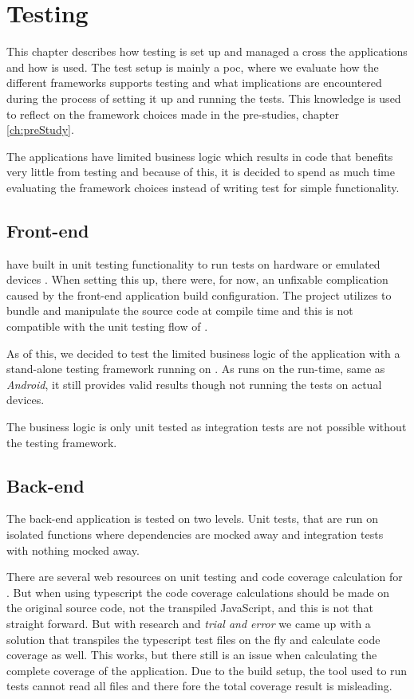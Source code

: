 \chapter{Testing}
This chapter describes how testing is set up and managed a cross the applications and how  is used.
The test setup is mainly a \gls{poc}, where we evaluate how the different frameworks supports testing and what implications are encountered during the process of setting it up and running the tests.
This knowledge is used to reflect on the framework choices made in the pre-studies, chapter \ref{ch:preStudy}.

The applications have limited business logic which results in code that benefits very little from testing and because of this, it is decided to spend as much time evaluating the framework choices instead of writing test for simple functionality.

\section{Front-end}
 have built in unit testing functionality to run tests on hardware or emulated devices \citep{testing:nativescript}.
When setting this up, there were, for now, an unfixable complication caused by the front-end application build configuration.
The project utilizes  to bundle and manipulate the source code at compile time and this is not compatible with the unit testing flow of .

As of this, we decided to test the limited business logic of the application with a stand-alone testing framework running on .
As  runs on the  run-time, same as \textit{Android}, it still provides valid results though not running the tests on actual devices.

The business logic is only unit tested as integration tests are not possible without the  testing framework.

\section{Back-end}
The back-end application is tested on two levels.
Unit tests, that are run on isolated functions where dependencies are mocked away and integration tests with nothing mocked away. 

There are several web resources on unit testing and code coverage calculation for .
But when using \gls{typescript} the code coverage calculations should be made on the original source code, not the transpiled JavaScript, and this is not that straight forward.
But with research and \textit{trial and error} we came up with a solution that transpiles the \gls{typescript} test files on the fly and calculate code coverage as well.
This works, but there still is an issue when calculating the complete coverage of the application.
Due to the build setup, the tool used to run tests cannot read all files and there fore the total coverage result is misleading.

